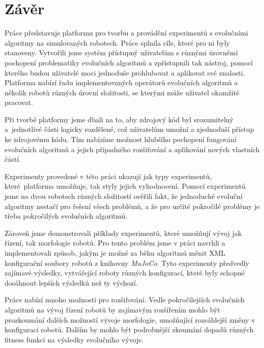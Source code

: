 \chapter*{Závěr}
Práce představuje platformu pro tvorbu a provádění experimentů s evolučními
algoritmy na simulovaných robotech. Práce splnila cíle, které pro ni byly
stanoveny. Vytvořili jsme systém přístupný uživatelům s různými úrovněmi
pochopení problematiky evolučních algoritmů a zpřístupnili tak nástroj, pomocí
kterého budou uživatelé moci jednoduše prohlubovat a aplikovat své znalosti.
Platforma nabízí řadu implementovaných operátorů evolučních algoritmů a několik
robotů různých úrovní složitosti, se kterými může uživatel okamžitě pracovat.

Při tvorbě platformy jsme dbali na to, aby zdrojový kód byl srozumitelný
a~jednotlivé části logicky rozdělené, což uživatelům umožní a zjednoduší
přístup ke zdrojovému kódu. Tím nabízíme možnost hlubšího pochopení fungování
evolučních algoritmů a jejich případného rozšiřování a aplikování nových
vlastních částí.

Experimenty provedené v této práci ukazují jak typy experimentů,
které~platforma umožňuje, tak styly jejich vyhodnocení. Pomocí experimentů jsme
na dvou robotech různých složitostí ověřili fakt, že jednoduché evoluční
algoritmy nestačí pro řešení všech problémů, a že pro určité pokročilé problémy
je třeba pokročilých evolučních algoritmů. 

Zároveň jsme demonstrovali příklady experimentů, které umožňují vývoj jak
řízení, tak morfologie robotů. Pro tento problém jsme v práci navrhli a
implementovali způsob, jakým je možné za běhu algoritmů měnit XML konfigurační
soubory robotů z knihovny \emph{MuJoCo}. Tyto experimenty předvedly zajímavé
výsledky, vytvářející roboty různých konfigurací, které byly schopné dosáhnout
lepších výsledků než ty výchozí.

Práce nabízí mnoho možností pro rozšiřování. Vedle pokročilejších evolučních
algoritmů na vývoj řízení robotů by zajímavým rozšířením mohlo být prozkoumání dalších
možností vývoje morfologie, umožňující rozsáhlejší změny v konfiguraci robotů.
Dalším by mohlo být podrobnější zkoumání dopadů různých fitness funkcí na
výsledky evolučního vývoje.

